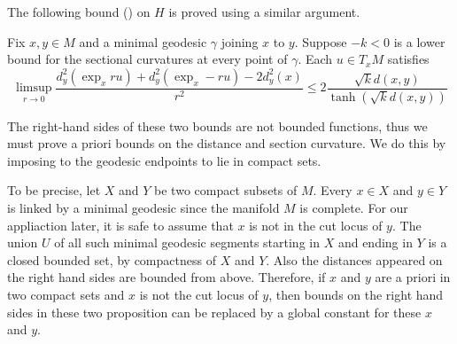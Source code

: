The following bound (\cite[Lemma 3.12]{cordero2001riemannian}) on $H$ is proved using a similar argument.
\begin{prop}
	\label{lem:hessian_bound_distance_squared}
	Fix \(  x , y \in M \) and
	a minimal geodesic \( \gamma \) joining \( x \) to \( y \).
	Suppose \( - k < 0 \) is a lower bound for
	the sectional curvatures at every point of \( \gamma \).
	Each \( u \in T _ { x } M \) satisfies
	\begin{equation*}
		\label{equa:hessian_bound_distance_squared}
		\limsup _ { r \rightarrow 0 } \frac { d _ { y } ^ { 2 } \left( \exp _ { x } r u \right) + d _ { y } ^ { 2 } \left( \exp _ { x } - r u \right) - 2 d _ { y } ^ { 2 } ( x ) }
		{ r ^ { 2 } } \leq 2 \frac{ \sqrt { k } d ( x , y ) }
		{\tanh ( \sqrt { k } d ( x , y ) )}
	\end{equation*}
\end{prop}

\begin{rmk}
	\label{rmk:global_hessian_bound}
	The right-hand sides of these two bounds are not bounded functions,
	thus we must prove a priori bounds on the distance and section curvature.
	We do this by imposing to the geodesic endpoints to lie in compact sets.

	To be precise, let $X$ and $Y$ be two compact subsets of $M$.
	Every \( x \in X \) and \( y \in Y \) is linked by a minimal geodesic since the manifold \( M \) is complete.
	For our appliaction later, it is safe to assume that $x$ is not in the cut locus of $y$.
	The union \( U \) of all such minimal geodesic segments
	starting in \( X \) and ending in \( Y \) is a closed bounded set, by compactness of \( X \) and \( Y \).
	Also the distances appeared on the right hand sides are bounded from above.
	Therefore,
	if $x$ and $y$ are a priori in two compact sets and $x$ is not the cut locus of $y$,
	then bounds on the right hand sides in these two proposition can be replaced by a global constant
	for these $x$ and $y$.
\end{rmk}

